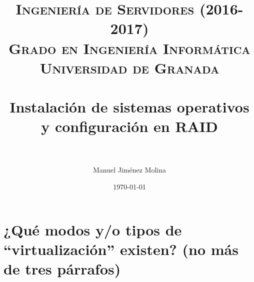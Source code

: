 
\title{	
	\normalfont \normalsize 
	\textsc{{\bf Ingeniería de Servidores (2016-2017)} \\ Grado en Ingeniería Informática \\ Universidad de Granada} \\ [25pt] %
	\horrule{0.5pt} \\[0.4cm] %
	\huge Instalación de sistemas operativos y configuración en RAID \\ %
	\horrule{2pt} \\[0.5cm] %
}

\author{Manuel Jiménez Molina} %

\date{\normalsize\today} %



	
	\maketitle %
	
	\newpage %
	
	\tableofcontents %
	
	\listoffigures
	
	\listoftables
	
	\newpage
	
	
	
	
	
	\newpage
	
	
	\section{¿Qué modos y/o tipos de “virtualización” existen? (no más de tres párrafos)}
	
